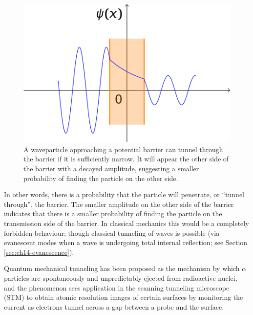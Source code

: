 \documentclass[
]{book}
\begin{document}
\begin{figure}

{\centering \includegraphics[width=0.7\linewidth]{visualisations/LaTeX/ch18-pestep4} 

}

\caption{A waveparticle approaching a potential barrier can tunnel through the barrier if it is sufficiently narrow. It will appear the other side of the barrier with a decayed amplitude, suggesting a smaller probability of finding the particle on the other side.}\label{fig:ch18-tunelling2}
\end{figure}

In other words, there is a probability that the particle will penetrate, or ``tunnel through'', the barrier. The smaller amplitude on the other side of the barrier indicates that there is a smaller probability of finding the particle on the transmission side of the barrier. In classical mechanics this would be a completely forbidden behaviour; though classical tunneling of waves is possible (via evanescent modes when a wave is undergoing total internal reflection; see Section \ref{sec:ch14-evanescence}).

Quantum mechanical tunneling has been proposed as the mechanism by which \(\alpha\) particles are spontaneously and unpredictably ejected from radioactive nuclei, and the phenomenon sees application in the scanning tunneling microscope (STM) to obtain atomic resolution images of certain surfaces by monitoring the current as electrons tunnel across a gap between a probe and the surface.

  
\end{document}
